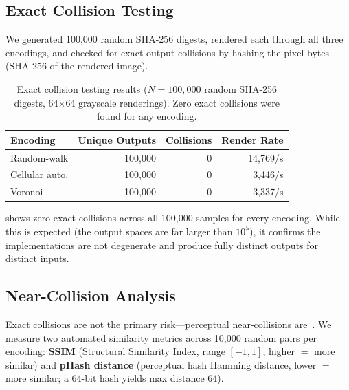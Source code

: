 \documentclass[conference,10pt]{IEEEtran}
\begin{document}
\subsection{Exact Collision Testing}

We generated 100,000 random SHA-256 digests, rendered each through all three encodings, and checked for exact output collisions by hashing the pixel bytes (SHA-256 of the rendered image).

\begin{table}[t]
\centering
\caption{Exact collision testing results ($N{=}100{,}000$ random SHA-256 digests, 64$\times$64 grayscale renderings). Zero exact collisions were found for any encoding.}
\label{tab:exact}
\small
\renewcommand{\arraystretch}{1.15}
\begin{tabular}{@{}l r r r@{}}
\toprule
\textbf{Encoding} & \textbf{Unique Outputs} & \textbf{Collisions} & \textbf{Render Rate} \\
\midrule
Random-walk & 100,000 & 0 & 14,769/s \\
Cellular auto. & 100,000 & 0 & 3,446/s \\
Voronoi & 100,000 & 0 & 3,337/s \\
\bottomrule
\end{tabular}
\end{table}

 shows zero exact collisions across all 100,000 samples for every encoding.
While this is expected (the output spaces are far larger than $10^5$), it confirms the implementations are not degenerate and produce fully distinct outputs for distinct inputs.

\subsection{Near-Collision Analysis}

Exact collisions are not the primary risk---perceptual near-collisions are~\cite{tan2017unicorns}.
We measure two automated similarity metrics across 10,000 random pairs per encoding:
\textbf{SSIM} (Structural Similarity Index, range $[-1, 1]$, higher $=$ more similar) and
\textbf{pHash distance} (perceptual hash Hamming distance, lower $=$ more similar; a 64-bit hash yields max distance 64).
\end{document}
